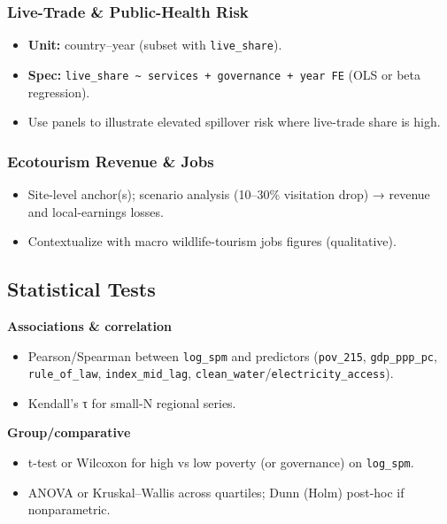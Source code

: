 \documentclass[
]{article}
\providecommand{\tightlist}{%
  \setlength{\itemsep}{0pt}\setlength{\parskip}{0pt}}
\begin{document}
\subsubsection{Live-Trade \& Public-Health
Risk}\label{live-trade-public-health-risk}

\begin{itemize}
\tightlist
\item
  \textbf{Unit:} country--year (subset with \texttt{live\_share}).
\item
  \textbf{Spec:}
  \texttt{live\_share\ \textasciitilde{}\ services\ +\ governance\ +\ year\ FE}
  (OLS or beta regression).
\item
  Use panels to illustrate elevated spillover risk where live-trade
  share is high.
\end{itemize}

\subsubsection{Ecotourism Revenue \&
Jobs}\label{ecotourism-revenue-jobs}

\begin{itemize}
\tightlist
\item
  Site-level anchor(s); scenario analysis (10--30\% visitation drop) →
  revenue and local-earnings losses.
\item
  Contextualize with macro wildlife-tourism jobs figures (qualitative).
\end{itemize}

\subsection{Statistical Tests}\label{statistical-tests}

\textbf{Associations \& correlation}

\begin{itemize}
\tightlist
\item
  Pearson/Spearman between \texttt{log\_spm} and predictors
  (\texttt{pov\_215}, \texttt{gdp\_ppp\_pc}, \texttt{rule\_of\_law},
  \texttt{index\_mid\_lag},
  \texttt{clean\_water}/\texttt{electricity\_access}).
\item
  Kendall's τ for small-N regional series.
\end{itemize}

\textbf{Group/comparative}

\begin{itemize}
\tightlist
\item
  t-test or Wilcoxon for high vs low poverty (or governance) on
  \texttt{log\_spm}.
\item
  ANOVA or Kruskal--Wallis across quartiles; Dunn (Holm) post-hoc if
  nonparametric.
\end{itemize}
\end{document}
